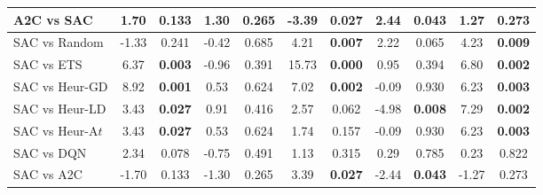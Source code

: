 \begin{tabular}{lcccccccccc}
	A2C vs SAC       & 1.70           & 0.133                  & 1.30           & 0.265                  & -3.39          & \textbf{0.027}         & 2.44           & \textbf{0.043}         & 1.27           & 0.273                  \\
	\midrule 
	SAC vs Random    & -1.33          & 0.241                  & -0.42          & 0.685                  & 4.21           & \textbf{0.007}         & 2.22           & 0.065                  & 4.23           & \textbf{0.009}         \\
	SAC vs ETS       & 6.37           & \textbf{0.003}         & -0.96          & 0.391                  & 15.73          & \textbf{0.000}         & 0.95           & 0.394                  & 6.80           & \textbf{0.002}         \\
	SAC vs Heur-GD   & 8.92           & \textbf{0.001}         & 0.53           & 0.624                  & 7.02           & \textbf{0.002}         & -0.09          & 0.930                  & 6.23           & \textbf{0.003}         \\
	SAC vs Heur-LD   & 3.43           & \textbf{0.027}         & 0.91           & 0.416                  & 2.57           & 0.062                  & -4.98          & \textbf{0.008}         & 7.29           & \textbf{0.002}         \\
	SAC vs Heur-A$t$ & 3.43           & \textbf{0.027}         & 0.53           & 0.624                  & 1.74           & 0.157                  & -0.09          & 0.930                  & 6.23           & \textbf{0.003}         \\
	SAC vs DQN       & 2.34           & 0.078                  & -0.75          & 0.491                  & 1.13           & 0.315                  & 0.29           & 0.785                  & 0.23           & 0.822                  \\
	SAC vs A2C       & -1.70          & 0.133                  & -1.30          & 0.265                  & 3.39           & \textbf{0.027}         & -2.44          & \textbf{0.043}         & -1.27          & 0.273             \\
	\bottomrule     
\end{tabular}